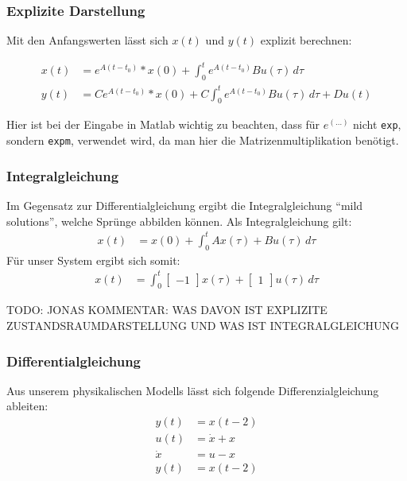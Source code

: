 \subsubsection{Explizite Darstellung}

Mit den Anfangswerten lässt sich $x(t)$ und $y(t)$ explizit berechnen:

\begin{align*}
    x(t) & = e^{A(t-t_0)} * x(0) + \int_{0}^{t} e^{A(t-t_0)}Bu(\tau) \,d\tau \nonumber \\
    y(t) & = Ce^{A(t-t_0)} * x(0) + C \int_{0}^{t} e^{A(t-t_0)}Bu(\tau) \,d\tau + Du(t)
\end{align*}

Hier ist bei der Eingabe in Matlab wichtig zu beachten, dass für $e^{(\ldots)}$ nicht \texttt{exp}, sondern \texttt{expm}, verwendet wird, da man hier die Matrizenmultiplikation benötigt.


\subsubsection{Integralgleichung}
Im Gegensatz zur Differentialgleichung ergibt die Integralgleichung \enquote{mild solutions}, welche Sprünge abbilden können.
Als Integralgleichung gilt:
\begin{align*}
    x(t) & = x(0) + \int_{0}^{t} Ax(\tau) + Bu(\tau)\,d\tau
\end{align*}
Für unser System ergibt sich somit:
\begin{align*}
    x(t) & = \int_{0}^{t} \begin{bmatrix}
        -1
    \end{bmatrix}x(\tau) + \begin{bmatrix}
        1
    \end{bmatrix}u(\tau)\,d\tau
\end{align*}

TODO: JONAS KOMMENTAR: WAS DAVON IST EXPLIZITE ZUSTANDSRAUMDARSTELLUNG UND WAS IST INTEGRALGLEICHUNG

\subsubsection{Differentialgleichung}
Aus unserem physikalischen Modells lässt sich folgende Differenzialgleichung ableiten:
\begin{align*}
    y(t) & = x(t - 2) \\
    u(t) & = \dot x + x \\
    \dot x & = u - x\\
    y(t) & = x(t - 2) \\
\end{align*}

